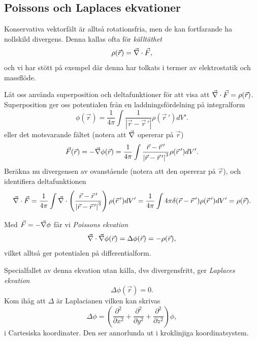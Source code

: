 \documentclass[%
oneside,                 %
final,                   %
10pt]{article}
\newenvironment{warning_mdfboxadmon}[1][]{
\begin{warning_mdfboxmdframed}[frametitle=#1]
}
{
\end{warning_mdfboxmdframed}
}
\begin{document}
\subsection*{Poissons och Laplaces ekvationer}

Konservativa vektorfält är alltså rotationsfria, men de kan fortfarande ha nollskild divergens. Denna kallas ofta för \emph{källtäthet}
\begin{equation}
\rho(\vec{r}) = \vec{\nabla} \cdot \vec{F},
\end{equation}
och vi har stött på exempel där denna har tolkats i termer av elektrostatik och massflöde. 


\begin{warning_mdfboxadmon}[Kommentar]
Låt oss använda superposition och deltafunktioner för att visa att $\vec{\nabla} \cdot \vec{F} = \rho(\vec{r})$. Superposition ger oss potentialen från en laddningsfördelning på integralform
$$
\phi(\vec{r}) = \frac{1}{4\pi} \int \frac{1}{\left| \vec{r} - \vec{r}\,' \right|} \rho(\vec{r}\,') dV'.
$$
eller det motsvarande fältet (notera att $\vec{\nabla}$ opererar på $\vec{r}$)
$$
\vec{F}(\vec{r}) = -\vec{\nabla} \phi(\vec{r}) = \frac{1}{4\pi} \int \frac{\vec{r} - \vec{r}\,'}{\left| \vec{r} - \vec{r}\,' \right|^3} \rho(\vec{r}\,') dV'.
$$
Beräkna nu divergensen av ovanstående (notera att den opererar på $\vec{r}$), och identifiera deltafunktionen
$$
\vec{\nabla} \cdot \vec{F} = \frac{1}{4\pi} \int \vec{\nabla} \cdot \left( \frac{\vec{r} - \vec{r}\,'}{\left| \vec{r} - \vec{r}\,' \right|^3}\right) \rho(\vec{r}\,') dV'
= \frac{1}{4\pi} \int 4\pi \delta( \vec{r} - \vec{r}\,' ) \rho(\vec{r}\,') dV' = \rho(\vec{r}).
$$
\end{warning_mdfboxadmon} %




Med $\vec{F} = -\vec{\nabla} \phi$ får vi \emph{Poissons ekvation}
\begin{equation}
\vec{\nabla} \cdot \vec{\nabla} \phi(\vec{r}) = \Delta \phi(\vec{r}) = -\rho(\vec{r}),
\end{equation}
vilket alltså ger potentialen på differentialform.

Specialfallet av denna ekvation utan källa, dvs divergensfritt, ger \emph{Laplaces ekvation}
\begin{equation}
\Delta \phi(\vec{r}) = 0.
\end{equation}
Kom ihåg att $\Delta$ är Laplacianen vilken kan skrivas
\begin{equation}
\Delta \phi = \left( \frac{\partial^2}{\partial x^2} + \frac{\partial^2}{\partial y^2} + \frac{\partial^2}{\partial z^2} \right) \phi,
\end{equation}
i Cartesiska koordinater. Den ser annorlunda ut i kroklinjiga koordinatsystem.
\end{document}
